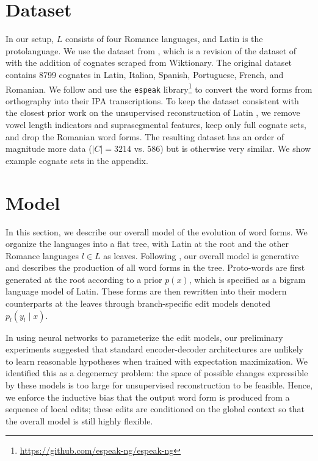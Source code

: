 \documentclass[11pt]{article}
\begin{document}
\section{Dataset}
\label{sec:dataset}
In our setup, $L$ consists of four Romance languages, and Latin is the protolanguage. We use the dataset from \citet{meloni-etal-2021-ab}, which is a revision of the dataset of \citet{dinu-ciobanu-2014-building} with the addition of cognates scraped from Wiktionary. The original dataset contains 8799 cognates in Latin, Italian, Spanish, Portuguese, French, and Romanian. We follow \citet{meloni-etal-2021-ab} and use the \texttt{espeak} library\footnote{\url{https://github.com/espeak-ng/espeak-ng}} to convert the word forms from orthography into their IPA transcriptions. To keep the dataset consistent with the closest prior work on the unsupervised reconstruction of Latin \citep{bouchard-cote-etal-2009-improved}, we remove vowel length indicators and suprasegmental features, keep only full cognate sets, and drop the Romanian word forms. The resulting dataset has an order of magnitude more data ($|C|=3214$ vs. $586$) but is otherwise very similar. We show example cognate sets in the appendix.


\section{Model}
\label{sec:model}
In this section, we describe our overall model of the evolution of word forms. We organize the languages into a flat tree, with Latin at the root and the other Romance languages $l \in L$ as leaves. Following \citet{bouchard-etal-2007-probabilistic}, our overall model is generative and describes the production of all word forms in the tree. 
Proto-words are first generated at the root according to a prior $p(x)$, which is specified as a bigram language model of Latin. These forms are then rewritten into their modern counterparts at the leaves through branch-specific edit models denoted $p_l(y_l \mid x)$.

In using neural networks to parameterize the edit models, our preliminary experiments suggested that standard encoder-decoder architectures are unlikely to learn reasonable hypotheses when trained with expectation maximization. We identified this as a degeneracy problem: the space of possible changes expressible by these models is too large for unsupervised reconstruction to be feasible. Hence, we enforce the inductive bias that the output word form is produced from a sequence of local edits; these edits are conditioned on the global context so that the overall model is still highly flexible.  
\end{document}
